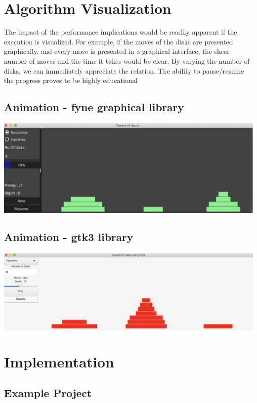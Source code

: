 \documentclass[a4paper,11pt]{article}
\theoremstyle{mytheor}
\begin{document}
\section*{Algorithm Visualization}

The impact of the performance implications would be readily apparent if the execution is visualized. For example, if the moves of the disks are presented graphically, and every move is presented in a graphical interface, the sheer number of moves and the time it takes would be clear. By varying the number of disks, we can immediately appreciate the relation. The ability 
to pause/resume the progress proves to be highly educational

\subsection*{Animation - fyne graphical library}
\includegraphics[width=6in]{TowersOfHanoi.png}

\subsection*{Animation - gtk3 library}
\includegraphics[width=6in]{gtkexample.png}

\section*{Implementation}

\subsection*{Example Project}
\end{document}
